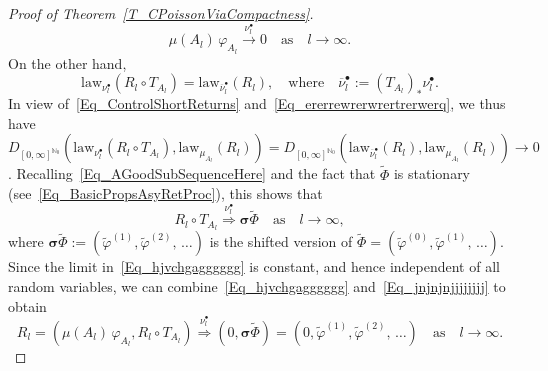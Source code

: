 \documentclass[10pt]{amsart}
\theoremstyle{definition}\newtheorem{defi}[theo]{Definition}\newtheorem{rema}[theo]{Remark}\newtheorem{exam}[theo]{Example}\newtheorem{exem}[theo]{Example}\newtheorem{nota}[theo]{Notation}
\newcommand{\law}{\mathrm{law}}
\newcommand{\bfsig}{\boldsymbol{\sigma}}
\newcommand{\bbN}{\mathbb{N}}
\begin{document}
\begin{proof}[Proof of Theorem~\ref{T_CPoissonViaCompactness}]
\begin{equation}
\mu(A_{l})\,\varphi_{A_{l}}\overset{\nu_{l}^{\bullet}}{\longrightarrow} 0\quad\text{as}\quad l\rightarrow\infty. 
\end{equation}
On the other hand, 
\[
\law_{\nu_{l}^{\bullet}}\left(R_{l}\circ T_{A_{l} }\right)=\law_{\overline{\nu}_{l}^{\bullet}}(R_{l}),\quad\text{where}\quad \overline{\nu }_{l}^{\bullet}:=(T_{A_{l}})_{\ast}\nu_{l}^{\bullet}.
\]
In view of~\eqref{Eq_ControlShortReturns} and~\eqref{Eq_ererrewrerwrertrerwerq}, we thus have $D_{[0,\infty]^{\bbN_{0}}}(\law_{\nu_{l}^{\bullet}} (R_{l}\circ T_{A_{l}}),\law_{\mu_{A_{l}}}(R_{l}))=D_{[0,\infty]^{\bbN_{0}}}(\law_{\overline{\nu}_{l}^{\bullet}}(R_{l}),\law_{\mu_{A_{l}}}(R_{l}))\rightarrow0$. Recalling~\eqref{Eq_AGoodSubSequenceHere} and the fact that $\widetilde{\Phi}$ is stationary (see~\eqref{Eq_BasicPropsAsyRetProc}), this shows that
\begin{equation}\label{Eq_jnjnjnjjjjjjjj}
R_{l}\circ T_{A_{l}}\overset{\nu_{l}^{\bullet}}{\Longrightarrow}
\bfsig\widetilde{\Phi} \quad \text{as}\quad l\rightarrow\infty,
\end{equation}
where $\bfsig\widetilde{\Phi}:=(\widetilde{\varphi}^{(1)},\widetilde{\varphi}^{(2)},\,\ldots)$ is the shifted version of $\widetilde {\Phi}=(\widetilde{\varphi}^{(0)},\widetilde{\varphi}^{(1)},\,\ldots)$. Since the limit in~\eqref{Eq_hjvchgagggggg} is constant, and hence independent of all random variables, we can combine~\eqref{Eq_hjvchgagggggg} and~\eqref{Eq_jnjnjnjjjjjjjj} to obtain
\begin{equation} \label{Eqwassssssaballl}
R_{l}=\left(\mu(A_{l})\,\varphi_{A_{l}},R_{l}\circ T_{A_{l}}\right)\overset{\nu _{l}^{\bullet}}{\Longrightarrow}\left(0,\bfsig\widetilde{\Phi }\right)=\left(0,\widetilde{\varphi}^{(1)},\widetilde{\varphi}^{(2)},\,\ldots\right) \quad\text{as}\quad l\rightarrow\infty.
\end{equation}


\end{proof}
\end{document}
